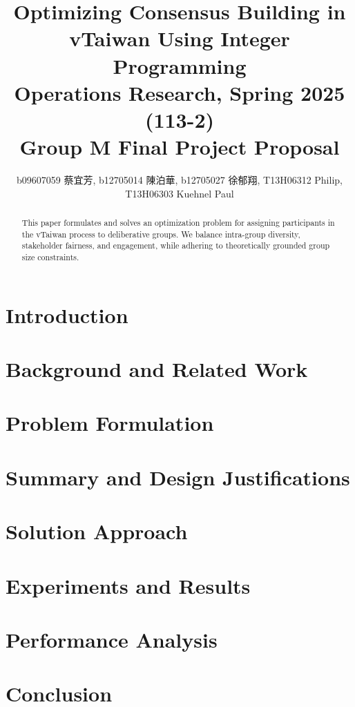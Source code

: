 \documentclass[11pt,a4paper]{article}
\title{Optimizing Consensus Building in vTaiwan Using Integer Programming \\
\large Operations Research, Spring 2025 (113-2) \\ Group M Final Project Proposal}
\author{b09607059 {\chinesefont 蔡宜芳}, b12705014 {\chinesefont 陳泊華},
    b12705027 {\chinesefont 徐郁翔}, T13H06312 Philip, T13H06303 Kuehnel Paul}
\affil{Department of Information Management, National Taiwan University}
\begin{document}
\maketitle


\begin{abstract}

\centering
This paper formulates and solves an optimization problem for assigning participants
in the vTaiwan process to deliberative groups.
We balance intra-group diversity, stakeholder fairness, and engagement,
while adhering to theoretically grounded group size constraints.

\end{abstract}

\newpage

\section{Introduction}\label{sec:intro}


\section{Background and Related Work}\label{sec:background}


\section{Problem Formulation}\label{sec:problem_formulation}


\section{Summary and Design Justifications}\label{sec:design}


\section{Solution Approach}\label{sec:solution}


\section{Experiments and Results}\label{sec:experiments}


\section{Performance Analysis}\label{sec:performance}


\section{Conclusion}\label{sec:conclusion}


\printbibliography
\end{document}
